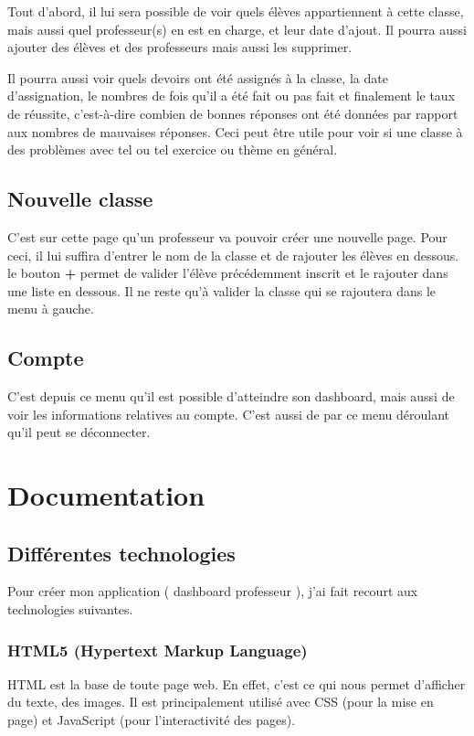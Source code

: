 \documentclass[letterpaper,10pt,french]{sphinxmanual}
\begin{document}
Tout d'abord, il lui sera possible de voir quels élèves appartiennent à cette
classe, mais aussi quel professeur(s) en est en charge, et leur date d'ajout.
Il pourra aussi ajouter des élèves et des professeurs mais aussi les supprimer.

Il pourra aussi voir quels devoirs ont été assignés à la classe, la date
d'assignation, le nombres de fois qu'il a été fait ou pas fait et finalement
le taux de réussite, c'est-à-dire combien de bonnes réponses ont été données par
rapport aux nombres de mauvaises réponses. Ceci peut être utile pour voir
si une classe à des problèmes avec tel ou tel exercice ou thème en général.


\section{Nouvelle classe}
\label{dashboard:nouvelle-classe}
C'est sur cette page qu'un professeur va pouvoir créer une nouvelle page. Pour
ceci, il lui suffira d'entrer le nom de la classe et de rajouter les élèves
en dessous. le bouton \textbf{+} permet de valider l'élève précédemment inscrit
et le rajouter dans une liste en dessous. Il ne reste qu'à valider la classe
qui se rajoutera dans le menu à gauche.


\section{Compte}
\label{dashboard:compte}
C'est depuis ce menu qu'il est possible d'atteindre son dashboard, mais aussi
de voir les informations relatives au compte. C'est aussi de par ce menu
déroulant qu'il peut se déconnecter.


\chapter{Documentation}
\label{documentation:documentation}\label{documentation::doc}

\section{Différentes technologies}
\label{documentation:differentes-technologies}
Pour créer mon application ( dashboard professeur ), j'ai fait recourt aux
technologies suivantes.


\subsection{HTML5 (Hypertext Markup Language)}
\label{documentation:html5-hypertext-markup-language}
HTML est la base de toute page web. En effet, c'est ce qui nous permet
d'afficher du texte, des images. Il est principalement utilisé avec CSS (pour la
mise en page) et JavaScript (pour l'interactivité des pages).
\end{document}

